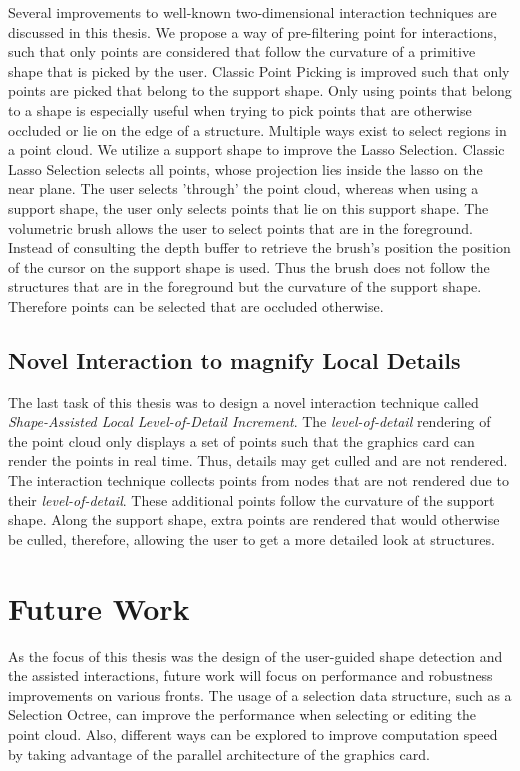 Several improvements to well-known two-dimensional interaction techniques are discussed in this thesis. We propose a way of pre-filtering point for interactions, such that only points are considered that follow the curvature of a primitive shape that is picked by the user. Classic Point Picking is improved such that only points are picked that belong to the support shape. Only using points that belong to a shape is especially useful when trying to pick points that are otherwise occluded or lie on the edge of a structure. Multiple ways exist to select regions in a point cloud. We utilize a support shape to improve the Lasso Selection. Classic Lasso Selection selects all points, whose projection lies inside the lasso on the near plane. The user selects 'through' the point cloud, whereas when using a support shape, the user only selects points that lie on this support shape. The volumetric brush allows the user to select points that are in the foreground. Instead of consulting the depth buffer to retrieve the brush's position the position of the cursor on the support shape is used. Thus the brush does not follow the structures that are in the foreground but the curvature of the support shape. Therefore points can be selected that are occluded otherwise. 


\subsection{Novel Interaction to magnify Local Details}

The last task of this thesis was to design a novel interaction technique called \textit{Shape-Assisted Local Level-of-Detail Increment}. The \textit{level-of-detail} rendering of the point cloud only displays a set of points such that the graphics card can render the points in real time. Thus, details may get culled and are not rendered. The interaction technique collects points from nodes that are not rendered due to their \textit{level-of-detail}. These additional points follow the curvature of the support shape. Along the support shape, extra points are rendered that would otherwise be culled, therefore, allowing the user to get a more detailed look at structures. 


\section{Future Work}

As the focus of this thesis was the design of the user-guided shape detection and the assisted interactions, future work will focus on performance and robustness improvements on various fronts. The usage of a selection data structure, such as a Selection Octree\cite{scheiblauer2011out}, can improve the performance when selecting or editing the point cloud. Also, different ways can be explored to improve computation speed by taking advantage of the parallel architecture of the graphics card. 
\\

